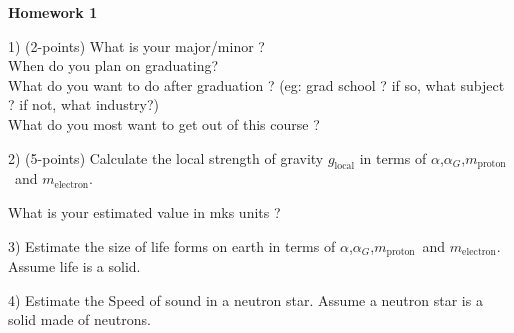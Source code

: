 
\usepackage{braket}

\def\ketY{\ensuremath{\ket {\Psi}}}
\def\iGeV{\ensuremath{\textrm{GeV}^{-1}}}
\def\mp{\ensuremath{m_{\textrm{proton}}}}
\def\rp{\ensuremath{r_{\textrm{proton}}}}
\def\me{\ensuremath{m_{\textrm{electron}}}}
\def\aG{\ensuremath{\alpha_G}}
\def\rAtom{\ensuremath{r_{\textrm{atom}}}}
\def\rNucl{\ensuremath{r_{\textrm{nucleus}}}}
\def\GN{\ensuremath{\textrm{G}_\textrm{N}}}



\textbf{\Huge Homework 1}

1) (2-points)
What is your major/minor ? \\
When do you plan on graduating?\\
What do you want to do after graduation ? (eg: grad school ? if so, what subject ? if not, what industry?)\\
What do you most want to get out of this course ? 

2) (5-points) Calculate the local strength of gravity $g_{\textrm{local}}$ in terms of $\alpha$,\aG,\mp\ and \me.

What is your estimated value in mks units ?

3) Estimate the size of life forms on earth in terms of $\alpha$,\aG,\mp\ and \me.
Assume life is a solid. 


4) Estimate the Speed of sound in a neutron star. 
   Assume a neutron star is a solid made of neutrons. 



